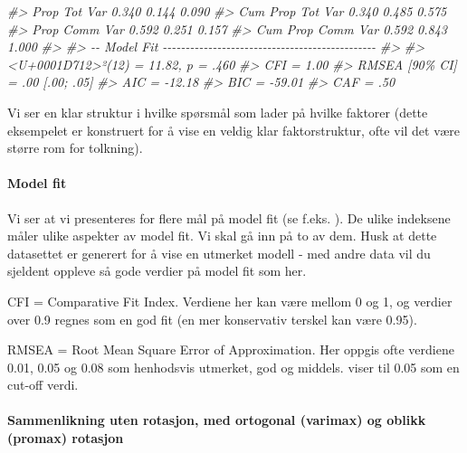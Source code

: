 \documentclass[
]{article}
\newenvironment{Shaded}{\begin{snugshade}}{\end{snugshade}}
\newcommand{\CommentTok}[1]{\textcolor[rgb]{0.56,0.35,0.01}{\textit{#1}}}
\begin{document}
\begin{Shaded}
\begin{Highlighting}[]
\CommentTok{\#\textgreater{} Prop Tot Var          0.340   0.144   0.090}
\CommentTok{\#\textgreater{} Cum Prop Tot Var      0.340   0.485   0.575}
\CommentTok{\#\textgreater{} Prop Comm Var         0.592   0.251   0.157}
\CommentTok{\#\textgreater{} Cum Prop Comm Var     0.592   0.843   1.000}
\CommentTok{\#\textgreater{} }
\CommentTok{\#\textgreater{} {-}{-} Model Fit {-}{-}{-}{-}{-}{-}{-}{-}{-}{-}{-}{-}{-}{-}{-}{-}{-}{-}{-}{-}{-}{-}{-}{-}{-}{-}{-}{-}{-}{-}{-}{-}{-}{-}{-}{-}{-}{-}{-}{-}{-}{-}{-}{-}{-}{-}{-}}
\CommentTok{\#\textgreater{} }
\CommentTok{\#\textgreater{} \textless{}U+0001D712\textgreater{}²(12) = 11.82, p = .460}
\CommentTok{\#\textgreater{} CFI = 1.00}
\CommentTok{\#\textgreater{} RMSEA [90\% CI] = .00 [.00; .05]}
\CommentTok{\#\textgreater{} AIC = {-}12.18}
\CommentTok{\#\textgreater{} BIC = {-}59.01}
\CommentTok{\#\textgreater{} CAF = .50}
\end{Highlighting}
\end{Shaded}

Vi ser en klar struktur i hvilke spørsmål som lader på hvilke faktorer (dette eksempelet er konstruert for å vise en veldig klar faktorstruktur, ofte vil det være større rom for tolkning).

\hypertarget{model-fit}{%
\paragraph{Model fit}\label{model-fit}}

Vi ser at vi presenteres for flere mål på model fit (se f.eks. \citet{finchUsingFitStatistic2020}). De ulike indeksene måler ulike aspekter av model fit. Vi skal gå inn på to av dem. Husk at dette datasettet er generert for å vise en utmerket modell - med andre data vil du sjeldent oppleve så gode verdier på model fit som her.

CFI = Comparative Fit Index. Verdiene her kan være mellom 0 og 1, og verdier over 0.9 regnes som en god fit \citep{huCutoffCriteriaFit1999} (en mer konservativ terskel kan være 0.95).

RMSEA = Root Mean Square Error of Approximation. Her oppgis ofte verdiene 0.01, 0.05 og 0.08 som henhodsvis utmerket, god og middels. \citet{finchUsingFitStatistic2020} viser til 0.05 som en cut-off verdi.

\hypertarget{sammenlikning-uten-rotasjon-med-ortogonal-varimax-og-oblikk-promax-rotasjon}{%
\paragraph{Sammenlikning uten rotasjon, med ortogonal (varimax) og oblikk (promax) rotasjon}\label{sammenlikning-uten-rotasjon-med-ortogonal-varimax-og-oblikk-promax-rotasjon}}
\end{document}
